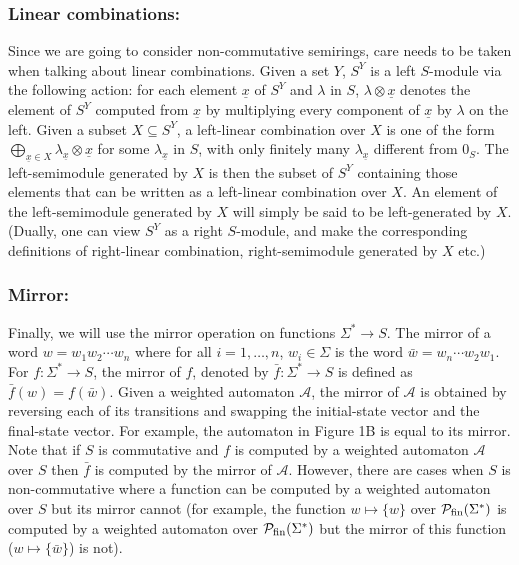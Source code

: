 \documentclass{lmcs}
\numberwithin{theorem}{section}
\begin{document}
\subsubsection*{\textbf{Linear combinations:}} Since we are going to consider non-commutative semirings, care needs to be taken when talking about linear combinations. Given a set $Y$, $S^Y$ is a left $S$-module via the following action: for each element $\underline{x}$ of $S^Y$ and $\lambda$ in $S$, $\lambda \otimes \underline{x}$ denotes the element of $S^Y$ computed from $\underline{x}$ by multiplying every component of $\underline{x}$ by $\lambda$ on the left. Given a subset $X \subseteq S^Y$, a left-linear combination over $X$ is one of the form $\bigoplus_{\underline{x} \in X} \lambda_{\underline{x}}\otimes \underline{x}$ for some $\lambda_{\underline{x}}$ in $S$, with only finitely many $\lambda_{\underline{x}}$ different from $0_S$. The left-semimodule generated by $X$ is then the subset of $S^Y$ containing those elements that can be written as a left-linear combination over $X$. An element of the left-semimodule generated by $X$ will simply be said to be left-generated by $X$. (Dually, one can view $S^Y$ as a right $S$-module, and make the corresponding definitions of right-linear combination, right-semimodule generated by $X$ etc.)

\subsubsection*{\textbf{Mirror:}} Finally, we will use the mirror operation on functions $\Sigma^* \to S$. The mirror of a word $w = w_1 w_2\cdots w_n$ where for all $i=1,\ldots, n$, $w_i \in \Sigma$ is the word $\bar{w} = w_n \cdots w_2 w_1$. For $f:\Sigma^* \to S$, the mirror of $f$, denoted by $\bar{f}:\Sigma^* \to S$ is defined as $\bar{f}(w) = f(\bar{w})$. Given a weighted automaton $\mathcal{A}$, the mirror of $\mathcal{A}$ is obtained by reversing each of its transitions and swapping the initial-state vector and the final-state vector. For example, the automaton in Figure 1B is equal to its mirror. Note that if $S$ is commutative and $f$ is computed by a weighted automaton $\mathcal{A}$ over $S$ then $\bar{f}$ is computed by the mirror of $\mathcal{A}$. However, there are cases when $S$ is non-commutative where a function can be computed by a weighted automaton over $S$ but its mirror cannot (for example, the function $w \mapsto \{w\}$ over $\mathcal{P}_{\rm fin}(\Sigma^*)$ is computed by a weighted automaton over $\mathcal{P}_{\rm fin}(\Sigma^*)$ but the mirror of this function ($w \mapsto \{\bar{w}\}$) is not).
\end{document}
